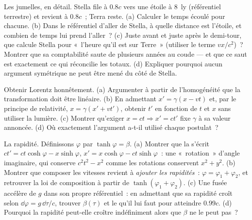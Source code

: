 \begin{exercise}[$\star\star\star$]\label{exo:b3:relativistic-kinematics:10}
Les jumelles, en détail. Stella file à $0.8c$ vers une étoile à
\qty{8}{ly} (référentiel terrestre) et revient à $0.8c$~; Terra reste.
(a) Calculer le temps écoulé pour chacune. (b) Dans le référentiel
d'aller de Stella, à quelle distance est l'étoile, et combien de temps
lui prend l'aller~? (c) Juste avant et juste après le demi-tour, que
calcule Stella pour «~l'heure qu'il est sur Terre~» (utiliser le terme
$vx/c^2$)~? Montrer que sa comptabilité saute de plusieurs années au
coude --- et que ce saut est exactement ce qui réconcilie les totaux.
(d) Expliquer pourquoi aucun argument symétrique ne peut être mené du
côté de Stella.
\end{exercise}

\begin{exercise}[$\star\star\star$]\label{exo:b3:relativistic-kinematics:11}
Obtenir Lorentz honnêtement. (a) Argumenter à partir de l'homogénéité
que la transformation doit être linéaire. (b) En admettant
$x' = \gamma(x - vt)$ et, par le principe de relativité,
$x = \gamma(x' + vt')$, obtenir $t'$ en fonction de $t$ et $x$ sans
utiliser la lumière. (c) Montrer qu'exiger
$x = ct \Rightarrow x' = ct'$ fixe $\gamma$ à sa valeur annoncée. (d)
Où exactement l'argument a-t-il utilisé chaque postulat~?
\end{exercise}

\begin{exercise}[$\star\star\star$]\label{exo:b3:relativistic-kinematics:12}
La rapidité. Définissons $\varphi$ par $\tanh\varphi = \beta$. (a)
Montrer que la  s'écrit
$ct' = ct\cosh\varphi - x\sinh\varphi$,
$x' = x\cosh\varphi - ct\sinh\varphi$~: une «~rotation~» d'angle
imaginaire, qui conserve $c^2t^2 - x^2$ comme les rotations conservent
$x^2 + y^2$. (b) Montrer que composer les vitesses revient à
\emph{ajouter les rapidités}~: $\varphi =
\varphi_1 + \varphi_2$, et retrouver la loi de composition à partir de
$\tanh(\varphi_1 + \varphi_2)$. (c) Une fusée accélère de $g$ dans son
propre référentiel~: en admettant que sa rapidité croît selon $\dd\varphi = g\,
\dd\tau/c$, trouver $\beta(\tau)$ et le  qu'il lui faut
pour atteindre $0.99c$. (d) Pourquoi la rapidité peut-elle croître
indéfiniment alors que $\beta$ ne le peut pas~?
\end{exercise}

